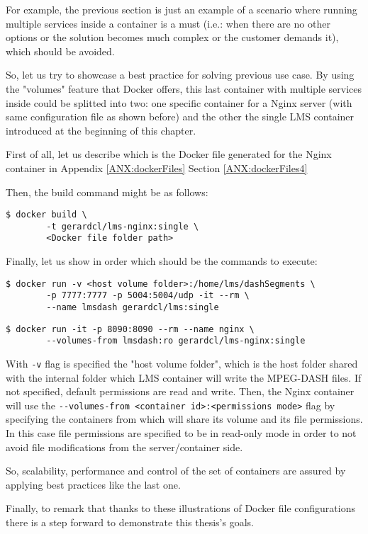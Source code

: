 For example, the previous section is just an example of a scenario where running multiple services inside a container is a must (i.e.: when there are no other options or the solution becomes much complex or the customer demands it), which should be avoided.

So, let us try to showcase a best practice for solving previous use case. By using the "volumes" feature that Docker offers, this last container with multiple services inside could be splitted into two: one specific container for a Nginx server (with same configuration file as shown before) and the other the single LMS container introduced at the beginning of this chapter. 

First of all, let us describe which is the Docker file generated for the Nginx container in Appendix
\ref{ANX:dockerFiles} Section \ref{ANX:dockerFiles4}

Then, the build command might be as follows:

\begin{verbatim}
$ docker build \
		-t gerardcl/lms-nginx:single \
		<Docker file folder path>
\end{verbatim}

Finally, let us show in order which should be the commands to execute:

\begin{verbatim}
$ docker run -v <host volume folder>:/home/lms/dashSegments \
		-p 7777:7777 -p 5004:5004/udp -it --rm \
		--name lmsdash gerardcl/lms:single
\end{verbatim}

\begin{verbatim}
$ docker run -it -p 8090:8090 --rm --name nginx \
		--volumes-from lmsdash:ro gerardcl/lms-nginx:single 
\end{verbatim}

With \verb|-v| flag is specified the "host volume folder", which is the host folder shared with the internal folder which LMS container will write the MPEG-DASH files. If not specified, default permissions are read and write. Then, the Nginx container will use the \verb|--volumes-from <container id>:<permissions mode>| flag by specifying the containers from which will share its volume and its file permissions. In this case file permissions are specified to be in read-only mode in order to not avoid file modifications from the server/container side.  
 
So, scalability, performance and control of the set of containers are assured by applying best practices like the last one.

Finally, to remark that thanks to these illustrations of Docker file configurations there is a step forward to demonstrate this thesis's goals.
